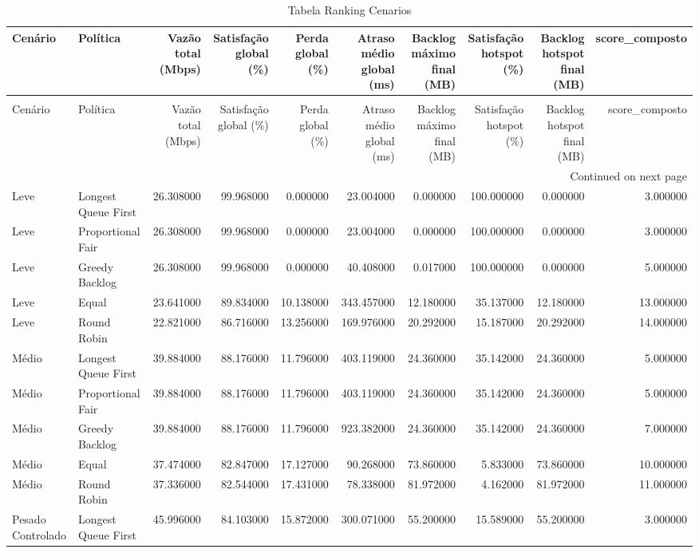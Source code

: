 \begin{longtable}{llrrrrrrrr}
\caption{Tabela Ranking Cenarios} \label{tab:tabela_ranking_cenarios} \\
\toprule
Cenário & Política & Vazão total (Mbps) & Satisfação global (\%) & Perda global (\%) & Atraso médio global (ms) & Backlog máximo final (MB) & Satisfação hotspot (\%) & Backlog hotspot final (MB) & score\_composto \\
\midrule
\endfirsthead
\caption[]{Tabela Ranking Cenarios} \\
\toprule
Cenário & Política & Vazão total (Mbps) & Satisfação global (\%) & Perda global (\%) & Atraso médio global (ms) & Backlog máximo final (MB) & Satisfação hotspot (\%) & Backlog hotspot final (MB) & score\_composto \\
\midrule
\endhead
\midrule
\multicolumn{10}{r}{Continued on next page} \\
\midrule
\endfoot
\bottomrule
\endlastfoot
Leve & Longest Queue First & 26.308000 & 99.968000 & 0.000000 & 23.004000 & 0.000000 & 100.000000 & 0.000000 & 3.000000 \\
Leve & Proportional Fair & 26.308000 & 99.968000 & 0.000000 & 23.004000 & 0.000000 & 100.000000 & 0.000000 & 3.000000 \\
Leve & Greedy Backlog & 26.308000 & 99.968000 & 0.000000 & 40.408000 & 0.017000 & 100.000000 & 0.000000 & 5.000000 \\
Leve & Equal & 23.641000 & 89.834000 & 10.138000 & 343.457000 & 12.180000 & 35.137000 & 12.180000 & 13.000000 \\
Leve & Round Robin & 22.821000 & 86.716000 & 13.256000 & 169.976000 & 20.292000 & 15.187000 & 20.292000 & 14.000000 \\
Médio & Longest Queue First & 39.884000 & 88.176000 & 11.796000 & 403.119000 & 24.360000 & 35.142000 & 24.360000 & 5.000000 \\
Médio & Proportional Fair & 39.884000 & 88.176000 & 11.796000 & 403.119000 & 24.360000 & 35.142000 & 24.360000 & 5.000000 \\
Médio & Greedy Backlog & 39.884000 & 88.176000 & 11.796000 & 923.382000 & 24.360000 & 35.142000 & 24.360000 & 7.000000 \\
Médio & Equal & 37.474000 & 82.847000 & 17.127000 & 90.268000 & 73.860000 & 5.833000 & 73.860000 & 10.000000 \\
Médio & Round Robin & 37.336000 & 82.544000 & 17.431000 & 78.338000 & 81.972000 & 4.162000 & 81.972000 & 11.000000 \\
Pesado Controlado & Longest Queue First & 45.996000 & 84.103000 & 15.872000 & 300.071000 & 55.200000 & 15.589000 & 55.200000 & 3.000000 \\

\end{longtable}
